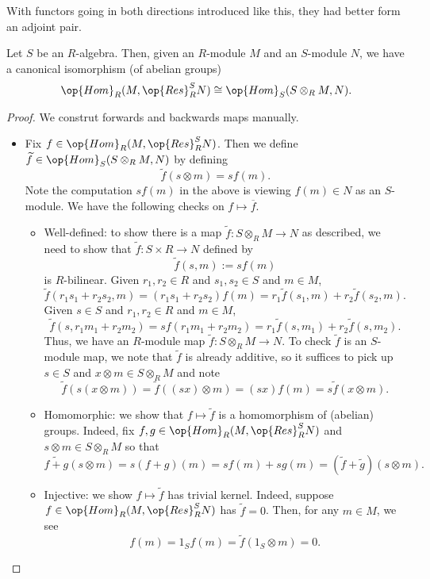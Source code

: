 With functors going in both directions introduced like this, they had better form an adjoint pair.
\begin{proposition} \label{prop:tenresadjoint}
	Let $S$ be an $R$-algebra. Then, given an $R$-module $M$ and an $S$-module $N$, we have a canonical isomorphism (of abelian groups)
	\[\op{Hom}_R(M,\op{Res}_R^SN)\cong\op{Hom}_S(S\otimes_RM,N).\]
\end{proposition}
\begin{proof}
	We construt forwards and backwards maps manually.
	\begin{itemize}
		\item Fix $f\in\op{Hom}_R(M,\op{Res}_R^SN)$. Then we define $\widetilde f\in\op{Hom}_S(S\otimes_RM,N)$ by defining
		\[\widetilde f(s\otimes m)=sf(m).\]
		Note the computation $sf(m)$ in the above is viewing $f(m)\in N$ as an $S$-module. We have the following checks on $f\mapsto\overline f$.
		\begin{itemize}
			\item Well-defined: to show there is a map $\widetilde f:S\otimes_RM\to N$ as described, we need to show that $\widetilde f:S\times R\to N$ defined by
			\[\widetilde f(s,m):=sf(m)\]
			is $R$-bilinear. Given $r_1,r_2\in R$ and $s_1,s_2\in S$ and $m\in M$,
			\[\widetilde f(r_1s_1+r_2s_2,m)=(r_1s_1+r_2s_2)f(m)=r_1\widetilde f(s_1,m)+r_2\widetilde f(s_2,m).\]
			Given $s\in S$ and $r_1,r_2\in R$ and $m\in M$,
			\[\widetilde f(s,r_1m_1+r_2m_2)=sf(r_1m_1+r_2m_2)=r_1\widetilde f(s,m_1)+r_2\widetilde f(s,m_2).\]
			Thus, we have an $R$-module map $\widetilde f:S\otimes_RM\to N$. To check $\widetilde f$ is an $S$-module map, we note that $\widetilde f$ is already additive, so it suffices to pick up $s\in S$ and $x\otimes m\in S\otimes_RM$ and note
			\[\widetilde f(s(x\otimes m))=\widetilde f((sx)\otimes m)=(sx)f(m)=s\widetilde f(x\otimes m).\]
			\item Homomorphic: we show that $f\mapsto\widetilde f$ is a homomorphism of (abelian) groups. Indeed, fix $f,g\in\op{Hom}_R(M,\op{Res}_R^SN)$ and $s\otimes m\in S\otimes_RM$ so that
			\[\widetilde{f+g}(s\otimes m)=s(f+g)(m)=sf(m)+sg(m)=(\widetilde f+\widetilde g)(s\otimes m).\]
			\item Injective: we show $f\mapsto\widetilde f$ has trivial kernel. Indeed, suppose $f\in\op{Hom}_R(M,\op{Res}_R^SN)$ has $\widetilde f=0$. Then, for any $m\in M$, we see
			\[f(m)=1_Sf(m)=\widetilde f(1_S\otimes m)=0.\]
		\end{itemize}


\end{itemize}
\end{proof}
